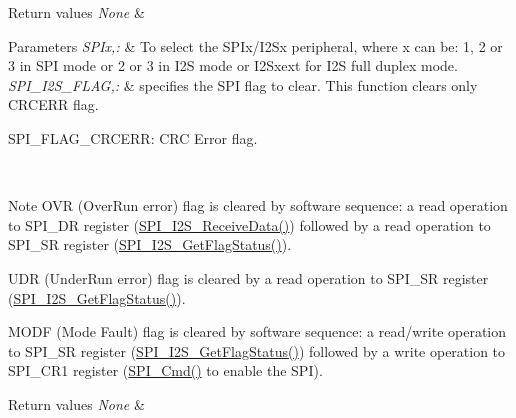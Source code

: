 \begin{DoxyRetVals}{Return values}
{\em None} & \\
\hline
\end{DoxyRetVals}

\begin{DoxyParams}{Parameters}
{\em S\-P\-Ix,\-:} & To select the S\-P\-Ix/\-I2\-Sx peripheral, where x can be\-: 1, 2 or 3 in S\-P\-I mode or 2 or 3 in I2\-S mode or I2\-Sxext for I2\-S full duplex mode. \\
\hline
{\em S\-P\-I\-\_\-\-I2\-S\-\_\-\-F\-L\-A\-G,\-:} & specifies the S\-P\-I flag to clear. This function clears only C\-R\-C\-E\-R\-R flag. \begin{DoxyItemize}
\item S\-P\-I\-\_\-\-F\-L\-A\-G\-\_\-\-C\-R\-C\-E\-R\-R\-: C\-R\-C Error flag.\end{DoxyItemize}
\\
\hline
\end{DoxyParams}
\begin{DoxyNote}{Note}
O\-V\-R (Over\-Run error) flag is cleared by software sequence\-: a read operation to S\-P\-I\-\_\-\-D\-R register (\hyperlink{group___s_p_i___exported___functions_gab77de76547f3bff403236b263b070a30}{S\-P\-I\-\_\-\-I2\-S\-\_\-\-Receive\-Data()}) followed by a read operation to S\-P\-I\-\_\-\-S\-R register (\hyperlink{group___s_p_i___exported___functions_ga1bd785d129e09c5734a876c8f2767204}{S\-P\-I\-\_\-\-I2\-S\-\_\-\-Get\-Flag\-Status()}). 

U\-D\-R (Under\-Run error) flag is cleared by a read operation to S\-P\-I\-\_\-\-S\-R register (\hyperlink{group___s_p_i___exported___functions_ga1bd785d129e09c5734a876c8f2767204}{S\-P\-I\-\_\-\-I2\-S\-\_\-\-Get\-Flag\-Status()}). 

M\-O\-D\-F (Mode Fault) flag is cleared by software sequence\-: a read/write operation to S\-P\-I\-\_\-\-S\-R register (\hyperlink{group___s_p_i___exported___functions_ga1bd785d129e09c5734a876c8f2767204}{S\-P\-I\-\_\-\-I2\-S\-\_\-\-Get\-Flag\-Status()}) followed by a write operation to S\-P\-I\-\_\-\-C\-R1 register (\hyperlink{group___s_p_i___exported___functions_gaa31357879a65ee1ed7223f3b9114dcf3}{S\-P\-I\-\_\-\-Cmd()} to enable the S\-P\-I).
\end{DoxyNote}

\begin{DoxyRetVals}{Return values}
{\em None} & \\
\hline
\end{DoxyRetVals}


